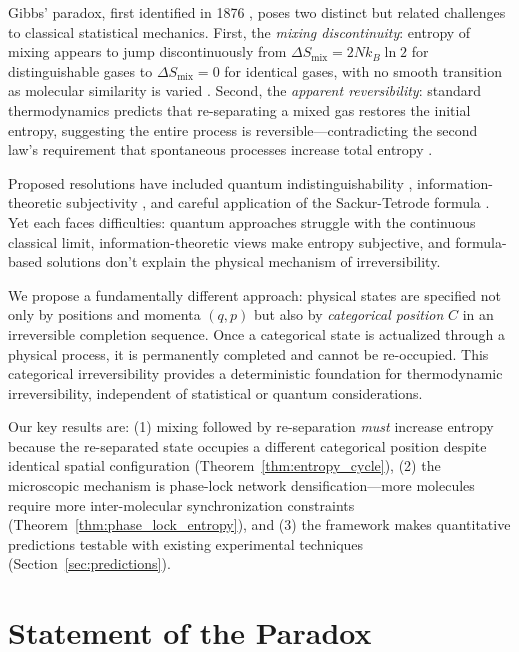 \documentclass[superscriptaddress,prb,10pt]{revtex4-2}
\theoremstyle{definition}
\theoremstyle{remark}
\begin{document}
Gibbs' paradox, first identified in 1876 \cite{gibbs1876}, poses two distinct but related challenges to classical statistical mechanics. First, the \emph{mixing discontinuity}: entropy of mixing appears to jump discontinuously from $\Delta S_{\text{mix}} = 2Nk_B \ln 2$ for distinguishable gases to $\Delta S_{\text{mix}} = 0$ for identical gases, with no smooth transition as molecular similarity is varied \cite{swendsen2008,dieks2011}. Second, the \emph{apparent reversibility}: standard thermodynamics predicts that re-separating a mixed gas restores the initial entropy, suggesting the entire process is reversible—contradicting the second law's requirement that spontaneous processes increase total entropy \cite{allahverdyan2011}.

Proposed resolutions have included quantum indistinguishability \cite{bach1997,saunders2006}, information-theoretic subjectivity \cite{jaynes1992,hemmo1997}, and careful application of the Sackur-Tetrode formula \cite{denbigh1981,lin2015}. Yet each faces difficulties: quantum approaches struggle with the continuous classical limit, information-theoretic views make entropy subjective, and formula-based solutions don't explain the physical mechanism of irreversibility.

We propose a fundamentally different approach: physical states are specified not only by positions and momenta $(q,p)$ but also by \emph{categorical position} $C$ in an irreversible completion sequence. Once a categorical state is actualized through a physical process, it is permanently completed and cannot be re-occupied. This categorical irreversibility provides a deterministic foundation for thermodynamic irreversibility, independent of statistical or quantum considerations.

Our key results are: (1) mixing followed by re-separation \emph{must} increase entropy because the re-separated state occupies a different categorical position despite identical spatial configuration (Theorem~\ref{thm:entropy_cycle}), (2) the microscopic mechanism is phase-lock network densification—more molecules require more inter-molecular synchronization constraints (Theorem~\ref{thm:phase_lock_entropy}), and (3) the framework makes quantitative predictions testable with existing experimental techniques (Section~\ref{sec:predictions}).

\section{Statement of the Paradox}
\end{document}
